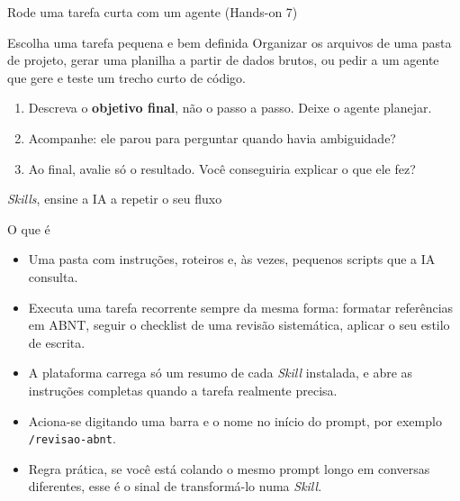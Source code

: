 \documentclass[11pt,aspectratio=169,t]{beamer}
\begin{document}
\begin{frame}{Rode uma tarefa curta com um agente (Hands-on 7)}
  \begin{block}{Escolha uma tarefa pequena e bem definida}
    Organizar os arquivos de uma pasta de projeto, gerar uma planilha a partir de dados brutos, ou pedir a um agente que gere e teste um trecho curto de código.
  \end{block}
  \vfill
  \begin{enumerate}
    \item Descreva o \textbf{objetivo final}, não o passo a passo. Deixe o agente planejar.
    \item Acompanhe: ele parou para perguntar quando havia ambiguidade?
    \item Ao final, avalie só o resultado. Você conseguiria explicar o que ele fez?
  \end{enumerate}
\end{frame}

\begin{frame}{\textit{Skills}, ensine a IA a repetir o seu fluxo}
  \small
  \begin{block}{O que é}
    \begin{itemize}
      \item Uma pasta com instruções, roteiros e, às vezes, pequenos scripts que a IA consulta.
      \item Executa uma tarefa recorrente sempre da mesma forma: formatar referências em ABNT, seguir o checklist de uma revisão sistemática, aplicar o seu estilo de escrita.
    \end{itemize}
  \end{block}
  \pause
  \vfill
  \begin{itemize}
    \item A plataforma carrega só um resumo de cada \textit{Skill} instalada, e abre as instruções completas quando a tarefa realmente precisa.
    \item Aciona-se digitando uma barra e o nome no início do prompt, por exemplo \texttt{/revisao-abnt}.
    \pause
    \item \alert{Regra prática}, se você está colando o mesmo prompt longo em conversas diferentes, esse é o sinal de transformá-lo numa \textit{Skill}.
  \end{itemize}
\end{frame}
\end{document}
